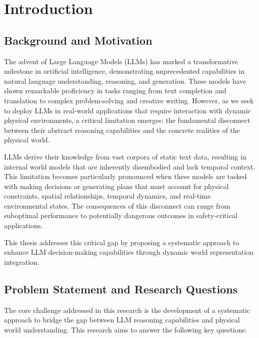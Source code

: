 
\chapter{Introduction} \label{chp:intro}

\section{Background and Motivation}

The advent of Large Language Models (LLMs) has marked a transformative milestone in artificial intelligence, demonstrating unprecedented capabilities in natural language understanding, reasoning, and generation. These models have shown remarkable proficiency in tasks ranging from text completion and translation to complex problem-solving and creative writing. However, as we seek to deploy LLMs in real-world applications that require interaction with dynamic physical environments, a critical limitation emerges: the fundamental disconnect between their abstract reasoning capabilities and the concrete realities of the physical world.

LLMs derive their knowledge from vast corpora of static text data, resulting in internal world models that are inherently disembodied and lack temporal context. This limitation becomes particularly pronounced when these models are tasked with making decisions or generating plans that must account for physical constraints, spatial relationships, temporal dynamics, and real-time environmental states. The consequences of this disconnect can range from suboptimal performance to potentially dangerous outcomes in safety-critical applications.

This thesis addresses this critical gap by proposing a systematic approach to enhance LLM decision-making capabilities through dynamic world representation integration.

\section{Problem Statement and Research Questions}

The core challenge addressed in this research is the development of a systematic approach to bridge the gap between LLM reasoning capabilities and physical world understanding. This research aims to answer the following key questions:

